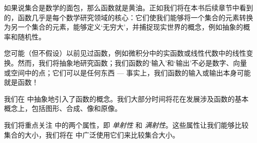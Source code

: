 如果说集合是数学的面包，那么函数就是黄油。正如我们将在本书后续章节中看到的，函数几乎是每个数学研究领域的核心：它们使我们能够将一个集合的元素转换为另一个集合的元素，能够定义`无穷大'，并捕捉现实世界的概念，例如抽象的概率和随机性。

您可能（但不假设）以前见过函数，例如微积分中的实函数或线性代数中的线性变换。然而，我们将抽象地研究函数；我们函数的`输入'和`输出'不必是数字、向量或空间中的点；它们可以是任何东西 --- 事实上，我们函数的输入或输出本身可能就是函数！

我们在  中抽象地引入了函数的概念。我们大部分时间将花在发展涉及函数的基本概念上，包括图形、合成、像和原像。

我们将重点关注  中的两个属性，即 \textit{单射性} 和 \textit{满射性}。这些属性让我们能够比较集合的大小，我们将在  中广泛使用它们来比较集合大小。